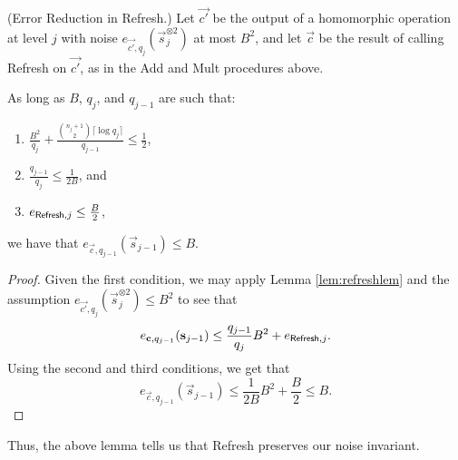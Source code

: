     \begin{lemma} \label{lem:bgvrefreshreduction} (Error Reduction in \textsf{Refresh}.)
        Let $\vec{c'}$ be the output of a homomorphic operation at level $j$ with noise $e_{\vec{c'}, q_j}(\vec{s}_j^{\otimes 2})$ at most $B^2$, and let $\vec{c}$ be the result of calling \textsf{Refresh} on $\vec{c'}$, as in the \textsf{Add} and \textsf{Mult} procedures above.

        As long as $B$, $q_j$, and $q_{j-1}$ are such that:
        \begin{enumerate}
            \item $\frac{B^2}{q_j} + \frac{{{n_j + 1}\choose{2}} \lceil \log q_j \rceil}{q_{j-1}} \leq \frac{1}{2}$,
            \item $\frac{q_{j-1}}{q_j} \leq \frac{1}{2B}$, and
            \item $e_{{\sf Refresh}, j} \leq \frac{B}{2}$,
        \end{enumerate}

        we have that $e_{\vec{c}, q_{j-1}}(\vec{s}_{j-1}) \leq B$.
    \end{lemma}
    \begin{proof}
        Given the first condition, we may apply Lemma \ref{lem:refreshlem} and the assumption  $e_{\vec{c'}, q_j}(\vec{s}_j^{\otimes 2}) \leq B^2$ to see that
        \[e_{\vec{c}, q_{j-1}}(\vec{s}_{j-1}) \leq \frac{q_{j-1}}{q_j} B^2 + e_{{\sf Refresh}, j}.\]
        Using the second and third conditions, we get that
        \[e_{\vec{c}, q_{j-1}}(\vec{s}_{j-1}) \leq \frac{1}{2B} B^2 + \frac{B}{2} \leq B.\]

    \end{proof}

    Thus, the above lemma tells us that \textsf{Refresh} preserves our noise invariant.


